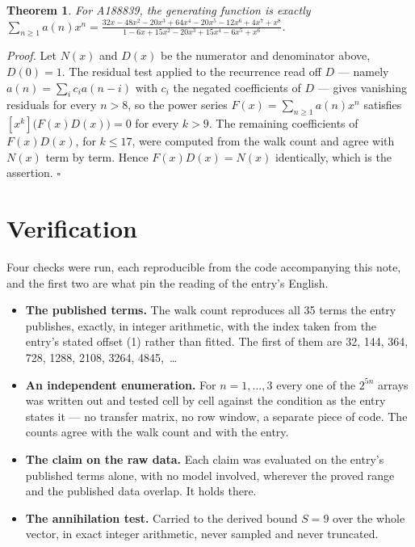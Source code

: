 \documentclass[11pt]{article}
\newtheorem{theorem}{Theorem}
\theoremstyle{definition}
\begin{document}
\begin{theorem} For A188839, the generating function is exactly $\sum_{n\ge 1} a(n)x^n = \frac{32x - 48x^{2} - 20x^{3} + 64x^{4} - 20x^{5} - 12x^{6} + 4x^{7} + x^{8}}{1 - 6x + 15x^{2} - 20x^{3} + 15x^{4} - 6x^{5} + x^{6}}$.\end{theorem}

{\itshape Proof.} Let $N(x)$ and $D(x)$ be the numerator and denominator above, $D(0)=1$. The residual test applied to the recurrence read off $D$ --- namely $a(n) = \sum_i c_i a(n-i)$ with $c_i$ the negated coefficients of $D$ --- gives vanishing residuals for every $n > 8$, so the power series $F(x)=\sum_{n\ge 1}a(n)x^n$ satisfies $[x^k]\bigl(F(x)D(x)\bigr) = 0$ for every $k > 9$. The remaining coefficients of $F(x)D(x)$, for $k \le 17$, were computed from the walk count and agree with $N(x)$ term by term. Hence $F(x)D(x) = N(x)$ identically, which is the assertion. $\square$

\section{Verification}

Four checks were run, each reproducible from the code accompanying this note, and the first two are what pin the reading of the entry's English.

\begin{itemize}

\item {\bfseries The published terms.} The walk count reproduces all 35 terms the entry publishes, exactly, in integer arithmetic, with the index taken from the entry's stated offset (1) rather than fitted. The first of them are 32, 144, 364, 728, 1288, 2108, 3264, 4845,~\dots

\item {\bfseries An independent enumeration.} For $n = 1,\dots,3$ every one of the $2^{5n}$ arrays was written out and tested cell by cell against the condition as the entry states it --- no transfer matrix, no row window, a separate piece of code. The counts agree with the walk count and with the entry.

\item {\bfseries The claim on the raw data.} Each claim was evaluated on the entry's published terms alone, with no model involved, wherever the proved range and the published data overlap. It holds there.

\item {\bfseries The annihilation test.} Carried to the derived bound $S = 9$ over the whole vector, in exact integer arithmetic, never sampled and never truncated.

\end{itemize}
\end{document}
